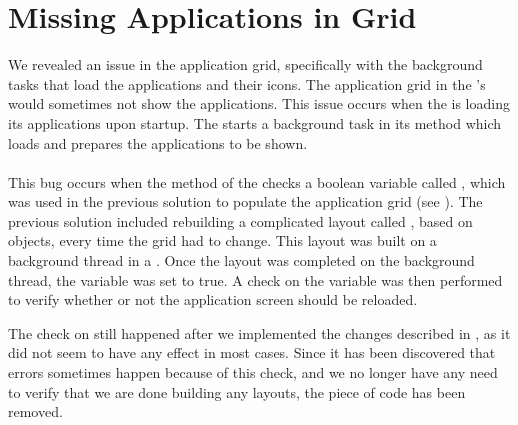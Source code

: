 
\section{Missing Applications in Grid}
\label{sec:missing_apps_racecondition}

We revealed an issue in the application grid, specifically with the background tasks that load the applications and their icons. The application grid in the \launcher's  would sometimes not show the applications. This issue occurs when the \launcher is loading its applications upon startup. The \launcher starts a background task in its  method which loads and prepares the applications to be shown.
\\\\
This bug occurs when the  method of the  checks a boolean variable called , which was used in the previous solution to populate the application grid (see ). The previous solution included rebuilding a complicated layout called , based on  objects, every time the grid had to change. This layout was built on a background thread in a . Once the layout was completed on the background thread, the variable  was set to true. A check on the variable was then performed to verify whether or not the application screen should be reloaded.

The check on  still happened after we implemented the changes described in , as it did not seem to have any effect in most cases. Since it has been discovered that errors sometimes happen because of this check, and we no longer have any need to verify that we are done building any layouts, the piece of code has been removed.